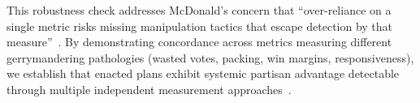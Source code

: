 This robustness check addresses McDonald's concern that ``over-reliance on a single metric risks missing manipulation tactics that escape detection by that measure''~\cite{mcdonald2006comparative}. By demonstrating concordance across metrics measuring different gerrymandering pathologies (wasted votes, packing, win margins, responsiveness), we establish that enacted plans exhibit systemic partisan advantage detectable through multiple independent measurement approaches~\cite{goedert2020unfair,warshaw2022partisan}.
